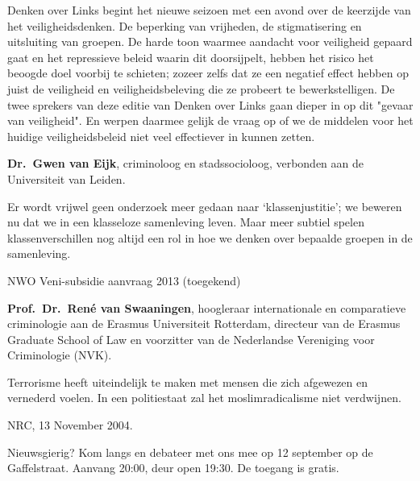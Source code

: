 \documentclass{article}
\begin{document}
\vfill

Denken over Links begint het nieuwe seizoen met een avond over de keerzijde van
het veiligheidsdenken. De beperking van vrijheden, de stigmatisering en
uitsluiting van groepen. De harde toon waarmee aandacht voor veiligheid gepaard
gaat en het repressieve beleid waarin dit doorsijpelt, hebben het risico het
beoogde doel voorbij te schieten; zozeer zelfs dat ze een negatief effect
hebben op juist de veiligheid en veiligheidsbeleving die ze probeert te
bewerkstelligen. De twee sprekers van deze editie van Denken over Links gaan
dieper in op dit "gevaar van veiligheid". En werpen daarmee gelijk de vraag op
of we de middelen voor het huidige veiligheidsbeleid niet veel effectiever in
kunnen zetten.

\vfill

\textbf{Dr.\ Gwen van Eijk}, criminoloog en stadssocioloog, verbonden aan de
Universiteit van Leiden.
\begin{myquote}
  Er wordt vrijwel geen onderzoek meer gedaan naar `klassenjustitie'; we
  beweren nu dat we in een klasseloze samenleving leven. Maar meer subtiel
  spelen klassenverschillen nog altijd een rol in hoe we denken over bepaalde
  groepen in de samenleving.
\end{myquote}
{\footnotesize NWO Veni-subsidie aanvraag 2013 (toegekend)}

\vfill

\textbf{Prof.\ Dr.\ Ren\'e van Swaaningen}, hoogleraar internationale en comparatieve
criminologie aan de Erasmus Universiteit Rotterdam, directeur van de Erasmus
Graduate School of Law en voorzitter van de Nederlandse Vereniging voor
Criminologie (NVK).
\begin{myquote}
  Terrorisme heeft uiteindelijk te maken met mensen die zich afgewezen en
  vernederd voelen. In een politiestaat zal het moslimradicalisme niet
  verdwijnen.
\end{myquote}
{\footnotesize NRC, 13 November 2004.}

\vfill

Nieuwsgierig? Kom langs en debateer met ons mee op 12 september op de Gaffelstraat.
Aanvang 20:00, deur open 19:30. De toegang is gratis.

\myhline
\end{document}

